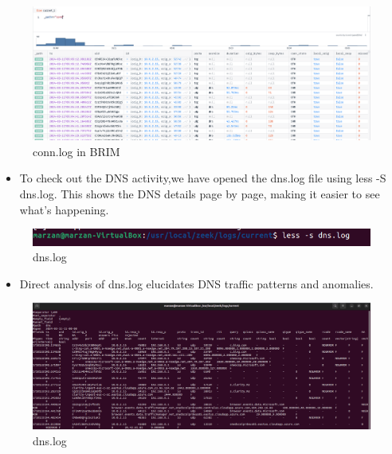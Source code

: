 \begin{figure}[H]
    \centering
    \includegraphics[width=1\linewidth]{images/live_monitor/live_brim_conn.png}
    \caption{conn.log in BRIM}
    \label{fig:enter-label}
\end{figure}

\begin{itemize}
    \item To check out the DNS activity,we have opened the dns.log file using less -S dns.log. This shows the DNS details page by page, making it easier to see what's happening.
\end{itemize}

\begin{figure}[H]
    \centering
    \includegraphics[width=1\linewidth]{images/live_monitor/less_dns_live.png}
    \caption{dns.log}
    \label{fig:enter-label}
\end{figure}

\begin{itemize}
    \item Direct analysis of dns.log elucidates DNS traffic patterns and anomalies.
\end{itemize}


\begin{figure}[H]
    \centering
    \includegraphics[width=1\linewidth]{images/new_2.png}
    \caption{dns.log}
    \label{fig:enter-label}
\end{figure}

